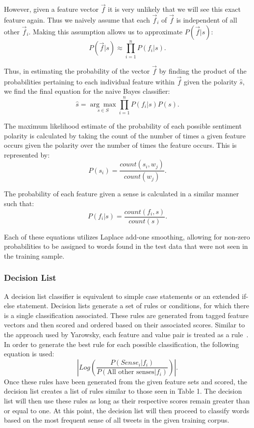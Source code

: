 \documentclass[11pt]{article}
\begin{document}
However, given a feature vector $\vec{f}$ it is very unlikely that we will see
this exact feature again. Thus we naively assume that each $\vec{f}_i$ of 
$\vec{f}$ is independent of all other $\vec{f}_i$. Making this assumption
allows us to approximate $P(\vec{f}|s)$:
\[P(\vec{f}|s)\approx{\prod_{i=1}^n}P(f_i|s).\]

Thus, in estimating the probability of the vector $\vec{f}$ by finding the
product of the probabilities pertaining to each individual feature within
$\vec{f}$ given the polarity $\hat{s}$, we find the final equation for the
naive Bayes classifier:
\[\hat{s}= \underset{{s}\in{S}}{\arg\max}{{\prod_{i=1}^n}P(f_i|s)}P(s).\]

The maximum likelihood estimate of the probability of each possible sentiment
polarity is calculated by taking the count of the number of times a given 
feature occurs given the polarity over the number of times the feature occurs. 
This is represented by:
\[P(s_i) = \frac{count(s_i,w_j)}{count(w_j)}.\]

The probability of each feature given a sense is calculated in a similar manner such that:
\[P(f_i|s) = \frac{count(f_i,s)}{count(s)}.\]

Each of these equations utilizes Laplace add-one smoothing, allowing for non-zero probabilities to be assigned to words found in the test data that were not seen in the training sample.  

\subsubsection*{Decision List}
A decision list classifier is equivalent to simple case statements or an extended if-else statement. Decision lists generate a set of rules or conditions, for which there is a single classification associated. These rules are generated from tagged feature vectors and then scored and ordered based on their associated scores. Similar to the approach used by Yarowsky, each feature and value pair is treated as a rule~\cite{yarowsky1994decision}. In order to generate the best rule for each possible classification, the following equation is used:
\[\left|Log\left({\frac{P(Sense_i|f_i)}{P(\text{All other senses}|f_i)}}\right)\right|.\]
\indent Once these rules have been generated from the given feature sets and scored, the decision list creates a list of rules similar to those seen in Table 1. The decision list will then use these rules as long as their respective scores remain greater than or equal to one. At this point, the decision list will then proceed to classify words based on the most frequent sense of all tweets in the given training corpus.
\end{document}
